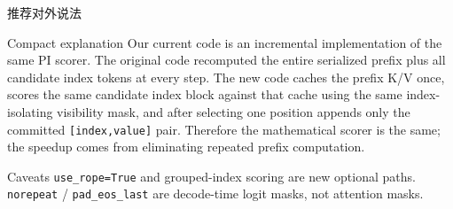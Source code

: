 \documentclass[aspectratio=169,10pt]{ctexbeamer}
\begin{document}
\begin{frame}{推荐对外说法}
  \begin{block}{Compact explanation}
    Our current code is an incremental implementation of the same PI scorer.
    The original code recomputed the entire serialized prefix plus all candidate
    index tokens at every step. The new code caches the prefix K/V once, scores
    the same candidate index block against that cache using the same
    index-isolating visibility mask, and after selecting one position appends
    only the committed \texttt{[index,value]} pair. Therefore the mathematical
    scorer is the same; the speedup comes from eliminating repeated prefix
    computation.
  \end{block}

  \begin{alertblock}{Caveats}
    \texttt{use\_rope=True} and grouped-index scoring are new optional paths.
    \texttt{norepeat} / \texttt{pad\_eos\_last} are decode-time logit masks, not
    attention masks.
  \end{alertblock}
\end{frame}
\end{document}
